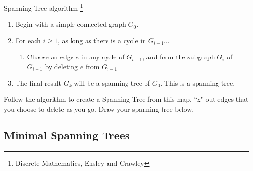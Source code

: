     \newpage

    \begin{intro}{Spanning Tree algorithm}
        \footnote{Discrete Mathematics, Ensley and Crawley}
        \begin{enumerate}
            \item   Begin with a simple connected graph $G_{0}$.
            \item   For each $i \geq 1$, as long as there is a cycle in $G_{i-1}$...
            \begin{enumerate}
                \item   Choose an edge $e$ in any cycle of $G_{i-1}$, and form the subgraph $G_{i}$
                of $G_{i-1}$ by deleting $e$ from $G_{i-1}$
            \end{enumerate}
            \item   The final result $G_{k}$ will be a spanning tree of $G_{0}$. This is a spanning tree.
        \end{enumerate}
    \end{intro}

    \begin{questionNOGRADE}{\thequestion}
        Follow the algorithm to create a Spanning Tree from this map.
        ``x" out edges that you choose to delete as you go. Draw your
        spanning tree below.
        
        \begin{center}
        \end{center}

    \end{questionNOGRADE}

    \newpage

    \subsection{Minimal Spanning Trees}

